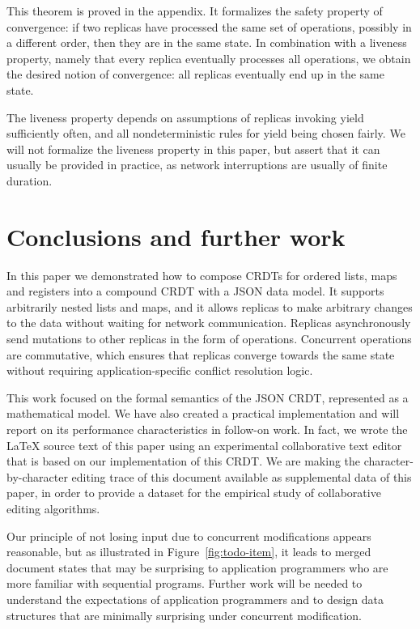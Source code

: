 \documentclass[10pt,journal,compsoc]{IEEEtran}
\begin{document}
This theorem is proved in the appendix. It formalizes the safety property of convergence: if two replicas have processed the same set of operations, possibly in a different order, then they are in the same state. In combination with a liveness property, namely that every replica eventually processes all operations, we obtain the desired notion of convergence: all replicas eventually end up in the same state.

The liveness property depends on assumptions of replicas invoking \textsf{yield} sufficiently often, and all nondeterministic rules for \textsf{yield} being chosen fairly. We will not formalize the liveness property in this paper, but assert that it can usually be provided in practice, as network interruptions are usually of finite duration.

\section{Conclusions and further work}

In this paper we demonstrated how to compose CRDTs for ordered lists, maps and registers into a compound CRDT with a JSON data model. It supports arbitrarily nested lists and maps, and it allows replicas to make arbitrary changes to the data without waiting for network communication. Replicas asynchronously send mutations to other replicas in the form of operations. Concurrent operations are commutative, which ensures that replicas converge towards the same state without requiring application-specific conflict resolution logic.

This work focused on the formal semantics of the JSON CRDT, represented as a mathematical model. We have also created a practical implementation and will report on its performance characteristics in follow-on work. In fact, we wrote the {\LaTeX} source text of this paper using an experimental collaborative text editor that is based on our implementation of this CRDT. We are making the character-by-character editing trace of this document available as supplemental data of this paper, in order to provide a dataset for the empirical study of collaborative editing algorithms.

Our principle of not losing input due to concurrent modifications appears reasonable, but as illustrated in Figure~\ref{fig:todo-item}, it leads to merged document states that may be surprising to application programmers who are more familiar with sequential programs. Further work will be needed to understand the expectations of application programmers and to design data structures that are minimally surprising under concurrent modification.
\end{document}
